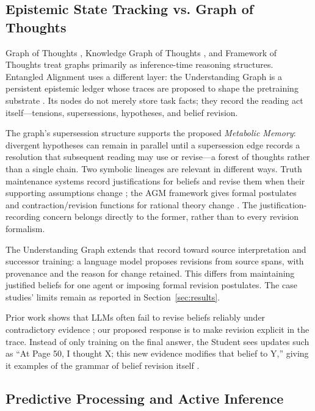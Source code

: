 \documentclass[11pt]{article}
\begin{document}
\subsection{Epistemic State Tracking vs. Graph of Thoughts}

Graph of Thoughts \cite{besta2024graph}, Knowledge Graph of Thoughts
\cite{besta2025kgot}, and Framework of Thoughts \cite{fricke2026fot} treat
graphs primarily as inference-time reasoning structures. Entangled Alignment
uses a different layer: the Understanding Graph is a persistent epistemic
ledger whose traces are proposed to shape the pretraining substrate
\cite{westerberg2026understanding}. Its nodes do not merely store task facts;
they record the reading act itself---tensions, supersessions, hypotheses, and
belief revision.

The graph's supersession structure supports the proposed
\emph{Metabolic Memory}: divergent hypotheses can remain in parallel until a
supersession edge records a resolution that subsequent reading may use or
revise---a forest of thoughts rather than a single chain. Two symbolic
lineages are relevant in different ways. Truth maintenance systems record
justifications for beliefs and revise them when their supporting assumptions
change \cite{doyle1979tms}; the AGM framework gives formal postulates and
contraction/revision functions for rational theory change
\cite{alchourron1985agm}. The justification-recording concern belongs directly
to the former, rather than to every revision formalism.

The Understanding Graph extends that record toward source interpretation and
successor training: a language model proposes revisions from source spans,
with provenance and the reason for change retained. This differs from
maintaining justified beliefs for one agent or imposing formal revision
postulates.
The case studies' limits remain as reported in Section~\ref{sec:results}.

Prior work shows that LLMs often fail to revise beliefs reliably
under contradictory evidence \cite{xu2024belief}; our proposed response is to
make revision explicit in the trace. Instead of only training on the final
answer, the Student sees updates such as ``At Page 50, I thought X; this new
evidence modifies that belief to Y,'' giving it examples of the grammar of
belief revision itself \cite{didolkar2024metacognitive, xu2024belief}.

\subsection{Predictive Processing and Active Inference}
\end{document}
